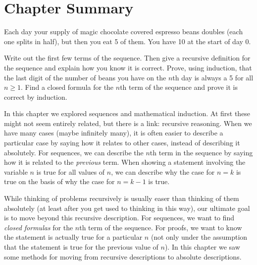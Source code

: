 \documentclass[12pt]{article}
\begin{document}
\section{Chapter Summary}\label{sec:sequences-conc}

\begin{activity}
Each day your supply of magic chocolate covered espresso beans doubles (each one splits in half), but then you eat 5 of them.  You have 10 at the start of day 0.

\begin{questions}
\question Write out the first few terms of the sequence.  Then give a recursive definition for the sequence and explain how you know it is correct.
\question Prove, using induction, that the last digit of the number of beans you have on the $n$th day is always a 5 for all $n \ge 1$.
\question Find a closed formula for the $n$th term of the sequence and prove it is correct by induction.
\end{questions}

\end{activity}

In this chapter we explored sequences and mathematical induction.  At first these might not seem entirely related, but there is a link: recursive reasoning.  When we have many cases (maybe infinitely many), it is often easier to describe a particular case by saying how it relates to other cases, instead of describing it absolutely.  For sequences, we can describe the $n$th term in the sequence by saying how it is related to the \emph{previous} term.  When showing a statement involving the variable $n$ is true for all values of $n$, we can describe why the case for $n = k$ is true on the basis of why the case for $n = k-1$ is true.

While thinking of problems recursively is usually easer than thinking of them absolutely (at least after you get used to thinking in this way), our ultimate goal is to move beyond this recursive description.  For sequences, we want to find \emph{closed formulas} for the $n$th term of the sequence.  For proofs, we want to know the statement is actually true for a particular $n$ (not only under the assumption that the statement is true for the previous value of $n$). In this chapter we saw some methods for moving from recursive descriptions to absolute descriptions.
\end{document}
